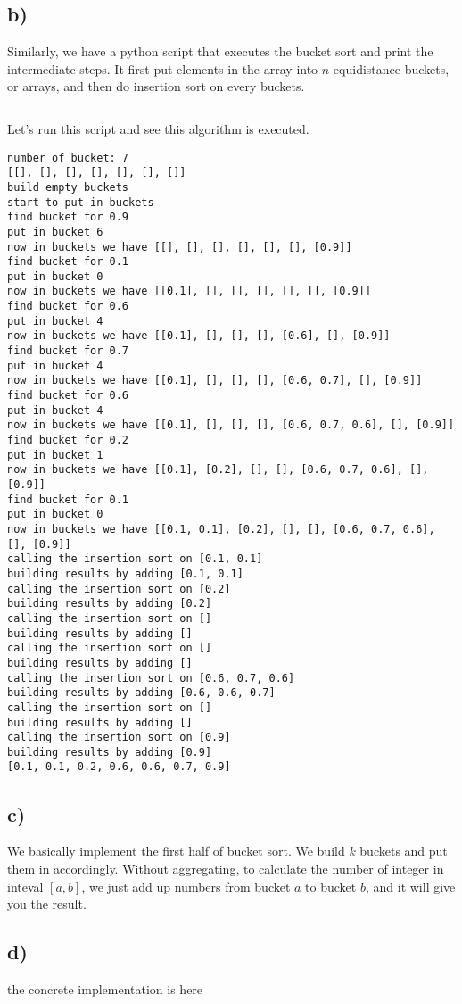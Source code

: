 \documentclass{article}
\begin{document}
\subsection*{b)}
Similarly, we have a python script that executes the
bucket sort and print the intermediate steps.
It first put elements in the array into $n$ equidistance
buckets, or arrays, and then do insertion sort on every
buckets.
\inputminted{Python}{bucket_sort.py}
Let's run this script and see this algorithm is executed.
\begin{verbatim}
number of bucket: 7
[[], [], [], [], [], [], []]
build empty buckets
start to put in buckets
find bucket for 0.9
put in bucket 6
now in buckets we have [[], [], [], [], [], [], [0.9]]
find bucket for 0.1
put in bucket 0
now in buckets we have [[0.1], [], [], [], [], [], [0.9]]
find bucket for 0.6
put in bucket 4
now in buckets we have [[0.1], [], [], [], [0.6], [], [0.9]]
find bucket for 0.7
put in bucket 4
now in buckets we have [[0.1], [], [], [], [0.6, 0.7], [], [0.9]]
find bucket for 0.6
put in bucket 4
now in buckets we have [[0.1], [], [], [], [0.6, 0.7, 0.6], [], [0.9]]
find bucket for 0.2
put in bucket 1
now in buckets we have [[0.1], [0.2], [], [], [0.6, 0.7, 0.6], [], [0.9]]
find bucket for 0.1
put in bucket 0
now in buckets we have [[0.1, 0.1], [0.2], [], [], [0.6, 0.7, 0.6], [], [0.9]]
calling the insertion sort on [0.1, 0.1]
building results by adding [0.1, 0.1]
calling the insertion sort on [0.2]
building results by adding [0.2]
calling the insertion sort on []
building results by adding []
calling the insertion sort on []
building results by adding []
calling the insertion sort on [0.6, 0.7, 0.6]
building results by adding [0.6, 0.6, 0.7]
calling the insertion sort on []
building results by adding []
calling the insertion sort on [0.9]
building results by adding [0.9]
[0.1, 0.1, 0.2, 0.6, 0.6, 0.7, 0.9]
\end{verbatim}
\subsection*{c)}
We basically implement the first half of bucket sort. We build $k$ buckets and
put them in accordingly. Without aggregating, to calculate the number of integer in
inteval $[a, b]$, we just add up numbers from bucket $a$ to bucket $b$, and it will give
you the result.
\subsection*{d)}
the concrete implementation is here
\inputminted{Python}{word_sort.py}
\end{document}
